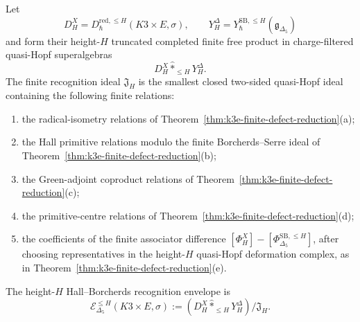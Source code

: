 \begin{definition}
\label{def:k3e-finite-recognition-envelope}
Let
\[
 D_H^X=D^{\mathrm{red},\leq H}_{\hbar}(K3\times E,\sigma),
 \qquad
 Y_H^\Delta=Y^{\mathrm{SB},\leq H}_{\hbar}(\mathfrak g_{\Delta_5})
\]
and form their height-\(H\) truncated completed finite free product in
charge-filtered quasi-Hopf superalgebras
\[
 D_H^X\widehat{*}_{\leq H}Y_H^\Delta .
\]
The finite recognition ideal \(\mathfrak J_H\) is the smallest closed
two-sided quasi-Hopf ideal containing the following finite relations:
\begin{enumerate}[label=\textup{(\roman*)}]
\item the radical-isometry relations of
Theorem~\ref{thm:k3e-finite-defect-reduction}\textup{(a)};
\item the Hall primitive relations modulo the finite
Borcherds--Serre ideal of
Theorem~\ref{thm:k3e-finite-defect-reduction}\textup{(b)};
\item the Green-adjoint coproduct relations of
Theorem~\ref{thm:k3e-finite-defect-reduction}\textup{(c)};
\item the primitive-centre relations of
Theorem~\ref{thm:k3e-finite-defect-reduction}\textup{(d)};
\item the coefficients of the finite associator difference
\([\Phi^X_H]-[\Phi^{\mathrm{SB},\leq H}_{\Delta_5}]\), after choosing
representatives in the height-\(H\) quasi-Hopf deformation complex, as
in Theorem~\ref{thm:k3e-finite-defect-reduction}\textup{(e)}.
\end{enumerate}
The height-\(H\) Hall--Borcherds recognition envelope is
\[
 \mathcal E^{\leq H}_{\Delta_5}(K3\times E,\sigma)
 :=
 \left(D_H^X\widehat{*}_{\leq H}Y_H^\Delta\right)/\mathfrak J_H .
\]
\end{definition}

